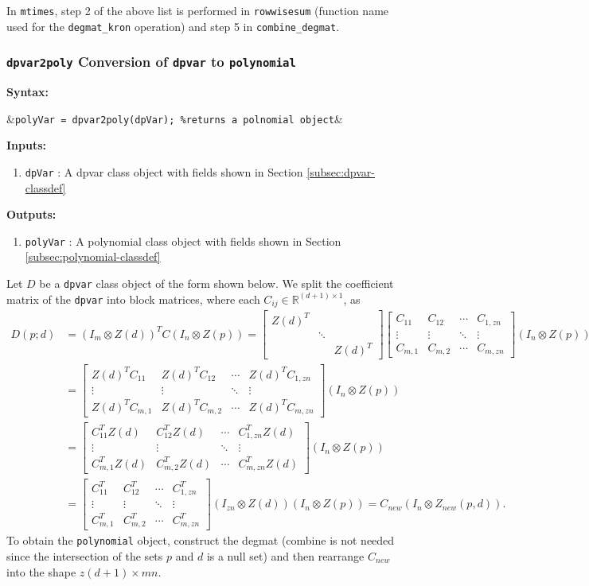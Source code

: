 \documentclass{article}
\newcommand{\bmat}[1]{\begin{bmatrix} #1\end{bmatrix}}
\newcommand{\R}{\mathbb{R}}
\newcommand{\C}{\mathbb{C}}
\newcommand{\Z}{\mathbb{Z}}
\begin{document}
	In \texttt{mtimes}, step 2 of the above list is performed in \texttt{rowwisesum} (function name used for the \texttt{degmat\_kron} operation) and step 5 in \texttt{combine\_degmat}.
	
	\subsubsection{\texttt{dpvar2poly} Conversion of \texttt{dpvar} to \texttt{polynomial}}\label{subsec:dpvar2poly}
	\textbf{Syntax:}
		\begin{flalign*}
			&\texttt{polyVar = dpvar2poly(dpVar); \%returns a polnomial object}&
		\end{flalign*}
	\textbf{Inputs:}
	\begin{enumerate}
		\item \texttt{dpVar} : A dpvar class object with fields shown in Section \ref{subsec:dpvar-classdef}
	\end{enumerate}
	\textbf{Outputs:}
	\begin{enumerate}
		\item \texttt{polyVar} : A polynomial class object with fields shown in Section \ref{subsec:polynomial-classdef}
	\end{enumerate}

	Let $D$ be a \texttt{dpvar} class object of the form shown below. We split the coefficient matrix of the \texttt{dpvar} into block matrices, where each $C_{ij} \in \R^{(d+1)\times 1}$, as
	\begin{align*}
		D(p;d) &= (I_m \otimes  Z(d))^T C (I_n \otimes Z(p)) = \bmat{Z(d)^T&&\\&\ddots&\\&&Z(d)^T}\bmat{C_{11}&C_{12}&\cdots&C_{1,zn}\\\vdots&\vdots&\ddots&\vdots\\C_{m,1}&C_{m,2}&\cdots&C_{m,zn}}(I_n \otimes Z(p))\\
		&=\bmat{Z(d)^TC_{11}&Z(d)^TC_{12}&\cdots&Z(d)^TC_{1,zn}\\\vdots&\vdots&\ddots&\vdots\\Z(d)^TC_{m,1}&Z(d)^TC_{m,2}&\cdots&Z(d)^TC_{m,zn}}(I_n \otimes Z(p))\\
		&=\bmat{C_{11}^TZ(d)&C_{12}^TZ(d)&\cdots&C_{1,zn}^TZ(d)\\\vdots&\vdots&\ddots&\vdots\\C_{m,1}^TZ(d)&C_{m,2}^TZ(d)&\cdots&C_{m,zn}^TZ(d)}(I_n \otimes Z(p))\\
		&=\bmat{C_{11}^T&C_{12}^T&\cdots&C_{1,zn}^T\\\vdots&\vdots&\ddots&\vdots\\C_{m,1}^T&C_{m,2}^T&\cdots&C_{m,zn}^T}
		(I_{zn} \otimes Z(d))(I_n \otimes Z(p)) = C_{new}(I_n \otimes Z_{new}(p,d)).
	\end{align*}
	To obtain the \texttt{polynomial} object, construct the degmat (combine is not needed since the intersection of the sets $p$ and $d$ is a null set) and then rearrange $C_{new}$ into the shape $z(d+1)\times mn$.
	
\end{document}
